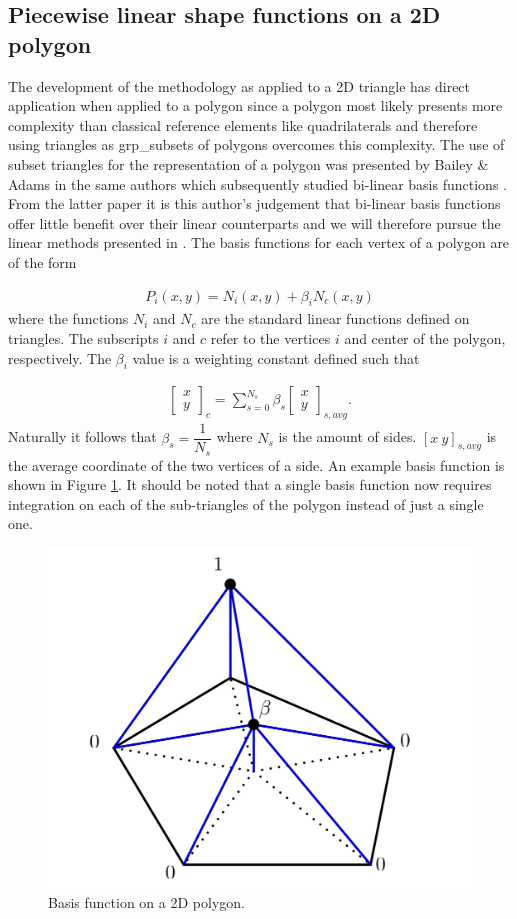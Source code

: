\documentclass[11pt,letterpaper,titlepage]{article}
\newcommand{\beqn}{\begin{equation}
	\begin{aligned}}
\newcommand{\eeqn}{\end{aligned}
	\end{equation}}
\numberwithin{equation}{section}
\begin{document}
\newpage 
\subsection{Piecewise linear shape functions on a 2D polygon}
The development of the methodology as applied to a 2D triangle has direct application when applied to a polygon since a polygon most likely presents more complexity than classical reference elements like quadrilaterals and therefore using triangles as grp_subsets of polygons overcomes this complexity. The use of subset triangles for the representation of a polygon was presented by Bailey \& Adams in \cite{BaileyAdamsPWLPolygons} the same authors which subsequently studied bi-linear basis functions \cite{BaileyAdamsPWBLPolygons}. From the latter paper it is this author's judgement that bi-linear basis functions offer little benefit over their linear counterparts and we will therefore pursue the linear methods presented in \cite{BaileyAdamsPWLPolygons}. The basis functions for each vertex of a polygon are of the form

\beqn 
P_i(x,y) = N_i(x,y) + \beta_i N_c(x,y)
\eeqn 
\newline
where the functions $N_i$ and $N_c$ are the standard linear functions defined on triangles. The subscripts $i$ and $c$ refer to the vertices $i$ and center of the polygon, respectively. The $\beta_i$ value is a weighting constant defined such that 

\beqn 
\begin{bmatrix}
x \\ y
\end{bmatrix}_{c}
= \sum_{s=0}^{N_{s}} \beta_s 
\begin{bmatrix}
x \\ y
\end{bmatrix}_{s,avg}.
\eeqn
\newline
Naturally it follows that $\beta_s = \dfrac{1}{N_{s}}$ where $N_s$ is the amount of sides. $[x \ y]_{s,avg}$ is the average coordinate of the two vertices of a side. An example basis function is shown in Figure \ref{fig:twodpolygon}. It should be noted that a single basis function now requires integration on each of the sub-triangles of the polygon instead of just a single one.

\begin{figure}[H]
\centering
\includegraphics[width=0.5\linewidth]{LatexDraw/TwoD_Polygon}
\caption{Basis function on a 2D polygon.}
\label{fig:twodpolygon}
\end{figure}
\end{document}
